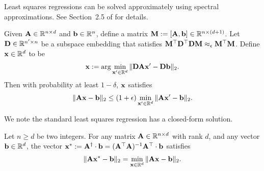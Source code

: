 Least squares regressions can be solved approximately using spectral approximations. See Section~2.5 of \cite{w14} for details.
\begin{lemma}\label{lem:approx_l2_regression_from_spectral_approx}
Given $\mathbf{A} \in \mathbb{R}^{n \times d}$ and $\mathbf{b} \in \mathbb{R}^n$, define a matrix $\mathbf{M} := [\mathbf{A}, \mathbf{b}] \in \mathbb{R}^{n \times (d+1)}$. Let $\mathbf{D} \in \mathbb{R}^{n' \times n}$ be a subspace embedding that satisfies $\mathbf{M}^{\top} \mathbf{D}^{\top} \mathbf{D} \mathbf{M} \approx_{\epsilon} \mathbf{M}^{\top} \mathbf{M}$.
Define $\mathbf{x} \in \mathbb{R}^d$ to be
\begin{align*}
    \mathbf{x} := \arg \min_{\mathbf{x}' \in \mathbb{R}^d} \|\mathbf{D} \mathbf{A} \mathbf{x}' - \mathbf{D} \mathbf{b}\|_2.
\end{align*}
Then with probability at least $1 - \delta$, $\mathbf{x}$ satisfies
\begin{align*}
\|\mathbf{A} \mathbf{x} - \mathbf{b}\|_2 \leq (1 + \epsilon) \min_{\mathbf{x}' \in \mathbb{R}^d} \|\mathbf{A} \mathbf{x}' - \mathbf{b}\|_2.
\end{align*}
\end{lemma}



We note the standard least squares regression has a closed-form solution.
\begin{fact}
\label{fact:closed-form}
Let $n \geq d$ be two integers. For any matrix $\mathbf{A} \in \mathbb{R}^{n \times d}$ with rank $d$, and any vector $\mathbf{b} \in \mathbb{R}^d$, the vector 
$\mathbf{x}^* := \mathbf{A}^{\dagger} \cdot \mathbf{b} = (\mathbf{A}^{\top} \mathbf{A})^{-1} \mathbf{A}^{\top} \cdot \mathbf{b}$ satisfies
\begin{align*}
    \|\mathbf{A} \mathbf{x}^* - \mathbf{b}\|_2 = \min_{\mathbf{x} \in \mathbb{R}^d} \|\mathbf{A} \mathbf{x} - \mathbf{b}\|_2.
\end{align*}
\end{fact}





